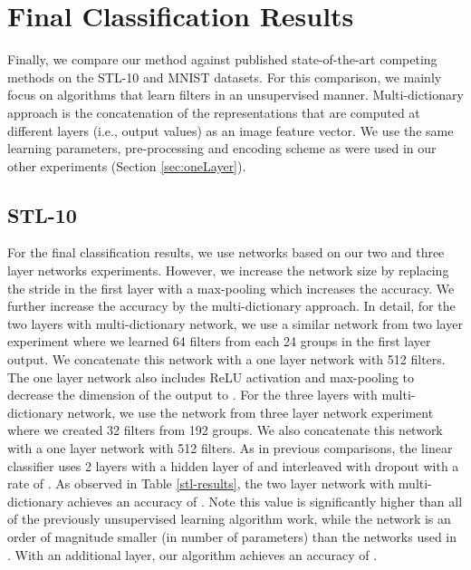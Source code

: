 \documentclass{article} \usepackage{iclr2016_workshop,times}
\begin{document}
\section{Final Classification Results}
\label{sec:results}

Finally, we compare our method against published state-of-the-art competing methods on the STL-10 and MNIST datasets.
For this comparison, we mainly focus on algorithms that learn filters in an unsupervised manner. Multi-dictionary approach \citep{coates2011selecting,lin2014stable} is the concatenation of the representations that are computed at different layers (i.e., output values) as an image feature vector. 
We use the same learning parameters, pre-processing and encoding scheme as were used in our other experiments (Section \ref{sec:oneLayer}). 

\subsection{STL-10}
For the final classification results, we use networks based on our two and three layer networks experiments. However, we increase the network size by replacing the stride in the first layer with a  max-pooling which increases the accuracy. We further increase the accuracy by the multi-dictionary approach.
In detail, for the two layers with multi-dictionary network, we use a similar network from two layer experiment where we learned 64 filters from each 24 groups in the first layer output.
We concatenate this network with a one layer network with 512 filters. The one layer network also includes ReLU activation and max-pooling to decrease the dimension of the output to .
For the three layers with multi-dictionary network, we use the network from three layer network experiment  where we created 32 filters from 192 groups. We also concatenate this network with a one layer network with 512 filters.
As in previous comparisons, the linear classifier uses 2 layers with a hidden layer of  and interleaved with dropout \citep{hinton2012improving} with a rate of . As observed in Table \ref{stl-results}, the two layer network with multi-dictionary achieves an accuracy of . Note this value is significantly higher than all of the previously unsupervised learning algorithm work, while the network is an order of magnitude smaller (in number of parameters) than the networks used in \citep{coates2011selecting,lin2014stable}. With an additional layer, our algorithm achieves an accuracy of .
\end{document}

